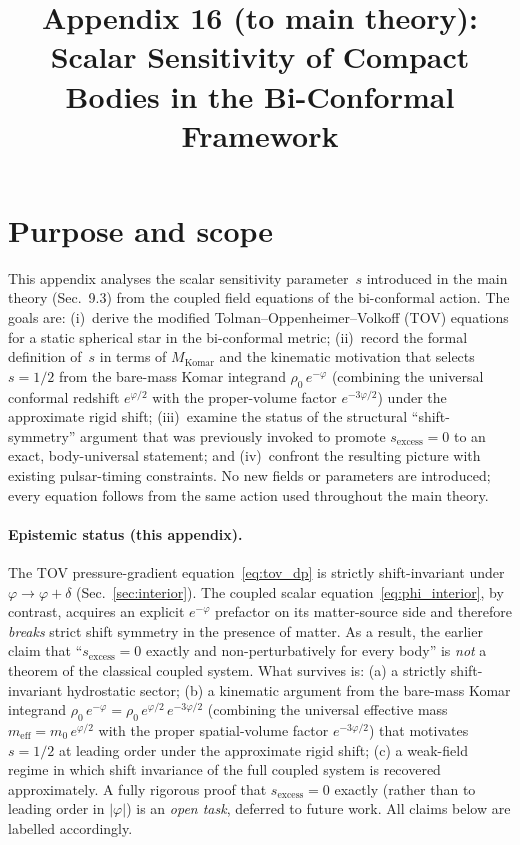 \documentclass[11pt]{article}
\title{Appendix 16 (to main theory): Scalar Sensitivity of Compact
  Bodies in the Bi-Conformal Framework}
\author{}
\date{}
\begin{document}
\let\phi\varphi
\maketitle

\section*{Purpose and scope}
This appendix analyses the scalar sensitivity parameter~$s$
introduced in the main theory (Sec.~9.3) from the coupled
field equations of the bi-conformal action.  The goals are:
(i)~derive the modified Tolman--Oppenheimer--Volkoff (TOV)
equations for a static spherical star in the bi-conformal
metric; (ii)~record the formal definition of~$s$ in terms of
$M_{\mathrm{Komar}}$ and the kinematic motivation that
selects $s = 1/2$ from the bare-mass Komar integrand
$\rho_0\,e^{-\phi}$ (combining the universal conformal
redshift $e^{\phi/2}$ with the proper-volume factor
$e^{-3\phi/2}$) under the approximate rigid shift; (iii)~examine the status of the structural
``shift-symmetry'' argument that was previously invoked to
promote $s_{\mathrm{excess}} = 0$ to an exact, body-universal
statement; and (iv)~confront the resulting picture with
existing pulsar-timing constraints.  No new fields or
parameters are introduced; every equation follows from the
same action used throughout the main theory.

\paragraph{Epistemic status (this appendix).}
The TOV pressure-gradient equation~\eqref{eq:tov_dp} is
strictly shift-invariant under $\phi\to\phi+\delta$
(Sec.~\ref{sec:interior}).  The coupled scalar
equation~\eqref{eq:phi_interior}, by contrast, acquires an
explicit $e^{-\phi}$ prefactor on its matter-source side and
therefore \emph{breaks} strict shift symmetry in the
presence of matter.  As a result, the earlier claim that
``$s_{\mathrm{excess}} = 0$ exactly and non-perturbatively
for every body'' is \emph{not} a theorem of the classical
coupled system.  What survives is: (a) a strictly
shift-invariant hydrostatic sector; (b) a kinematic
argument from the bare-mass Komar integrand
$\rho_0\,e^{-\phi} = \rho_0\,e^{\phi/2}\,e^{-3\phi/2}$
(combining the universal effective mass
$m_{\mathrm{eff}} = m_0\,e^{\phi/2}$ with the proper
spatial-volume factor $e^{-3\phi/2}$) that motivates
$s=1/2$ at leading order under the approximate rigid
shift; (c) a weak-field regime in which shift invariance
of the full coupled system is recovered approximately.  A fully
rigorous proof that $s_{\mathrm{excess}} = 0$ exactly
(rather than to leading order in $|\phi|$) is an
\emph{open task}, deferred to future work.  All claims
below are labelled accordingly.
\end{document}
